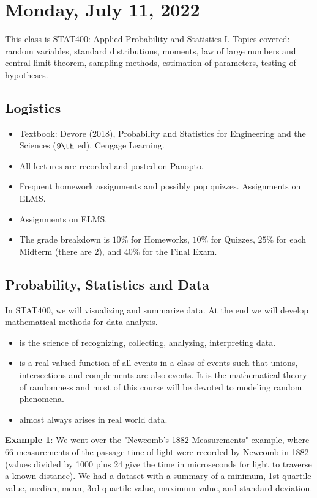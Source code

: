 \section{Monday, July 11, 2022}
This class is STAT400: Applied Probability and Statistics I. Topics covered: random variables, standard distributions, moments, law of large numbers and central limit theorem, sampling methods, estimation of parameters, testing of hypotheses.

\subsection{Logistics}
\begin{itemize}
	\item Textbook: Devore (2018), Probability and Statistics for Engineering and the Sciences ($9\th$ ed). Cengage Learning.
    \item All lectures are recorded and posted on Panopto.
    \item Frequent homework assignments and possibly pop quizzes. Assignments on ELMS.
    \item Assignments on ELMS. 
    \item The grade breakdown is $10\%$ for Homeworks, $10\%$ for Quizzes, $25\%$ for each Midterm (there are 2), and $40\%$ for the Final Exam. 
\end{itemize} 

\subsection{Probability, Statistics and Data}
In STAT400, we will visualizing and summarize data. At the end we will develop mathematical methods for data analysis.
\begin{itemize}
	\item {} is the science of recognizing, collecting, analyzing, interpreting data.
    \item {} is a real-valued function of all events in a class of events such that unions, intersections and complements are also events. It is the mathematical theory of randomness and most of this course will be devoted to modeling random phenomena.
	\item {} almost always arises in real world data.
\end{itemize}

\textbf{Example 1}: We went over the "Newcomb's 1882 Measurements" example, where 66 measurements of the passage time of light were recorded by Newcomb in 1882 (values divided by 1000 plus 24 give the time in microseconds for light to traverse a known distance). We had a dataset with a summary of a minimum, 1st quartile value, median, mean, 3rd quartile value, maximum value, and standard deviation.

